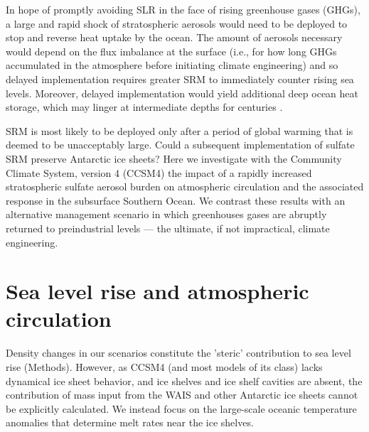 \documentclass{nature}
\begin{document}
In hope of promptly avoiding SLR in the face of rising greenhouse gases (GHGs), a large and rapid shock of stratospheric aerosols would need to be deployed to stop and reverse heat uptake by the ocean. The amount of aerosols necessary would depend on the flux imbalance at the surface (i.e., for how long GHGs accumulated in the atmosphere before initiating climate engineering) and so delayed implementation requires greater SRM to immediately counter rising sea levels. Moreover, delayed implementation would yield additional deep ocean heat storage, which may linger at intermediate depths for centuries \cite{gillett11}. 

SRM is most likely to be deployed only after a period of global warming that is deemed to be unacceptably large. Could a subsequent implementation of sulfate SRM preserve Antarctic ice sheets? Here we investigate with the Community Climate System, version 4 (CCSM4) the impact of a rapidly increased stratospheric sulfate aerosol burden on atmospheric circulation and the associated response in the subsurface Southern Ocean. We contrast these results with an alternative management scenario in which greenhouses gases are abruptly returned to preindustrial levels --- the ultimate, if not impractical, climate engineering.  

\section{Sea level rise and atmospheric circulation}

Density changes in our scenarios constitute the 'steric' contribution to sea level rise (Methods). However, as CCSM4 (and most models of its class) lacks dynamical ice sheet behavior, and ice shelves and ice shelf cavities are absent, the contribution of mass input from the WAIS and other Antarctic ice sheets cannot be explicitly calculated. We instead focus on the large-scale oceanic temperature anomalies that determine melt rates near the ice shelves. 
\end{document}
